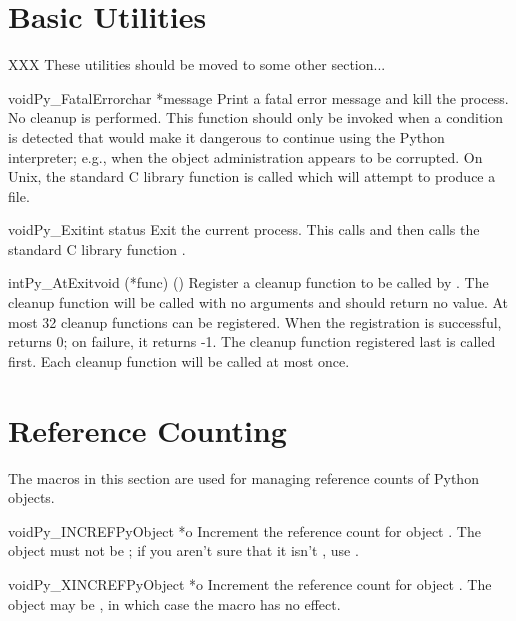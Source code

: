 \chapter{Basic Utilities}

XXX These utilities should be moved to some other section...

\begin{cfuncdesc}{void}{Py_FatalError}{char *message}
Print a fatal error message and kill the process.  No cleanup is
performed.  This function should only be invoked when a condition is
detected that would make it dangerous to continue using the Python
interpreter; e.g., when the object administration appears to be
corrupted.  On Unix, the standard C library function  is 
called which will attempt to produce a  file.
\end{cfuncdesc}

\begin{cfuncdesc}{void}{Py_Exit}{int status}
Exit the current process.  This calls  and then
calls the standard C library function .
\end{cfuncdesc}

\begin{cfuncdesc}{int}{Py_AtExit}{void (*func) ()}
Register a cleanup function to be called by .  The
cleanup function will be called with no arguments and should return no
value.  At most 32 cleanup functions can be registered.  When the
registration is successful,  returns 0; on failure, it
returns -1.  The cleanup function registered last is called first.
Each cleanup function will be called at most once.
\end{cfuncdesc}


\chapter{Reference Counting}

The macros in this section are used for managing reference counts
of Python objects.

\begin{cfuncdesc}{void}{Py_INCREF}{PyObject *o}
Increment the reference count for object .  The object must
not be \NULL{}; if you aren't sure that it isn't \NULL{}, use
.
\end{cfuncdesc}

\begin{cfuncdesc}{void}{Py_XINCREF}{PyObject *o}
Increment the reference count for object .  The object may be
\NULL{}, in which case the macro has no effect.
\end{cfuncdesc}

